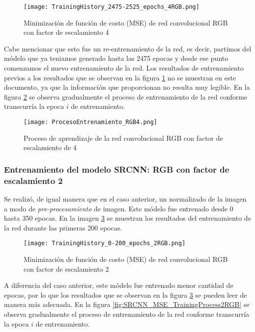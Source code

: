 \begin{figure}[H]
    \centering
    \texttt{[image: TrainingHistory\_2475-2525\_epochs\_4RGB.png]}
    \caption{Minimización de función de costo (MSE) de red convolucional RGB con factor de escalamiento 4}
    \label{fig:SRCNN_MSE_TrainingLoss4RGB}
\end{figure}

Cabe mencionar que esto fue un re-entrenamiento de la red, es decir, partimos del módelo que ya teniamos generado hasta las 2475
epocas y desde ese punto comenzamos el nuevo entrenamiento de la red. Los resultados de entrenamiento previos a los resultados
que se observan en la figura \ref{fig:SRCNN_MSE_TrainingLoss4RGB} no se muestran en este documento, ya que la información que
proporcionan no resulta muy legible. En la figura \ref{fig:SRCNN_MSE_TrainingProcess4RGB} se observa gradualmente el proceso de
entrenamiento de la red conforme transcurría la epoca $i$ de entrenamiento.

\begin{figure}[H]
    \centering
    \texttt{[image: ProcesoEntrenamiento\_RGB4.png]}
    \caption{Proceso de aprendizaje de la red convolucional RGB con factor de escalamiento de 4}
    \label{fig:SRCNN_MSE_TrainingProcess4RGB}
\end{figure}

\subsubsection{Entrenamiento del modelo SRCNN: RGB con factor de escalamiento 2}
Se realizó, de igual manera que en el caso anterior, un normalizado de la imagen a modo de \emph{pre-procesamiento} de imagen.
Este módelo fue entrenado desde 0 hasta 350 epocas. En la imagen \ref{fig:SRCNN_MSE_TrainingLoss2RGB} se muestran los resultados
del entrenamiento de la red durante las primeras 200 epocas.

\begin{figure}[H]
    \centering
    \texttt{[image: TrainingHistory\_0-200\_epochs\_2RGB.png]}
    \caption{Minimización de función de costo (MSE) de red convolucional RGB con factor de escalamiento 2}
    \label{fig:SRCNN_MSE_TrainingLoss2RGB}
\end{figure}

A diferencia del caso anterior, este módelo fue entrenado menor cantidad de epocas, por lo que los resultados que se observan
 en la figura \ref{fig:SRCNN_MSE_TrainingLoss2RGB} se pueden leer de manera más adecuada. En la figura
 \ref{fig:SRCNN_MSE_TrainingProcess2RGB} se observa gradualmente el proceso de entrenamiento de la red conforme transcurría la
 epoca $i$ de entrenamiento.


